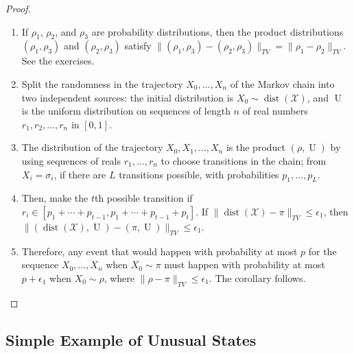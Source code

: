 \documentclass[12pt]{article}
\begin{document}
\begin{proof}
    \begin{enumerate}
        \item
            If \( \rho_1 \), \( \rho_{2} \), and \( \rho_3 \) are
            probability distributions, then the product
            distributions \(
            (\rho_1 , \rho_3 ) \) and \( (\rho_2 , \rho_3 ) \) satisfy \(
            \| (\rho_1 , \rho_3 )- (\rho_2, \rho_3 )\|_{TV} = \|\rho_1-
            \rho_2 \|_{TV} \).  See the exercises.
        \item
            Split the randomness in the trajectory \( X_0, \dots , X_n \)
            of the Markov chain into two independent sources:  the
            initial distribution is \( X_0 \sim
            \operatorname{dist}
            (\mathcal{X}) \), and \(
            \operatorname{U}
            \) is the uniform distribution on sequences of length \( n \)
            of real numbers \( r_1 , r_2, \dots, r_n \) in \( [0, 1] \).
        \item
            The distribution of the trajectory \( X_0 , X_1,\dots, X_n \)
            is the product \( (\rho,
            \operatorname{U}
            ) \) by using sequences of reals \( r_1, \dots, r_n \) to
            choose transitions in the chain; from \( X_i = \sigma_i \),
            if there are \( L \) transitions possible, with
            probabilities \( p_1, \dots, p_L \).
        \item
            Then, make the \( t \)th possible transition if \( r_i \in [p_1
            + \cdots + p_{t-1}, p_1 + \cdots + p_{t-1 }+ p_t] \).  If \(
            \|
            \operatorname{dist}
            (\mathcal{X})- \pi\|_{TV} \le \epsilon_1 \), then \( \|(
            \operatorname{dist}
            (\mathcal{X}),
            \operatorname{U}
            )- (\pi,
            \operatorname{U}
            )\|_{TV} \le \epsilon_1 \).
        \item
            Therefore, any event that would happen with probability at
            most \( p \) for the sequence \( X_0 ,\dots, X_n \) when \(
            X_0 \sim \pi \) must happen with probability at most \( p +
            \epsilon_1 \) when \( X_0 \sim \rho \), where \( \|\rho- \pi\|_
            {TV} \le \epsilon_1 \).  The corollary follows.
    \end{enumerate}
\end{proof}

\subsection*{Simple Example of Unusual States}
\end{document}
